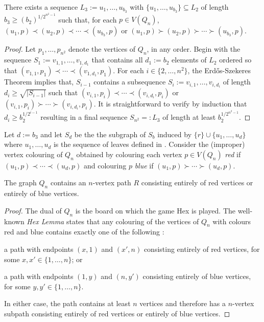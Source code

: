 \documentclass[kpfonts]{patmorin}
\renewcommand{\ge}{\geqslant}
\begin{document}
\begin{lem}
    There exists a sequence $L_3:=u_1,\ldots,u_{b_3}$ with $\{u_1,\ldots,u_{b_3}\}\subseteq L_2$ of length $b_3\ge (b_2)^{1/2^{n^2-1}}$ such that, for each $p\in V(Q_n)$, $(u_1,p)\prec (u_2,p)\prec\cdots\prec (u_{b_3},p)$ or $(u_1,p)\succ (u_2,p)\succ\cdots\succ (u_{b_3},p)$.
\end{lem}

\begin{proof}
    Let $p_1,\ldots,p_{n^2}$ denote the vertices of $Q_n$, in any order.
    Begin with the sequence $S_1:=v_{1,1},\ldots,v_{1,d_1}$ that contains all $d_1:=b_2$ elements of $L_2$ ordered so that $(v_{1,1},p_1)\prec\cdots\prec(v_{1,d_1},p_1)$.  For each $i\in\{2,\ldots,n^2\}$, the Erd\H{o}s-Szekeres Theorem implies that, $S_{i-1}$ contains a subsequence $S_i:=v_{i,1},\ldots,v_{i,d_i}$ of length $d_i\ge \sqrt{|S_{i-1}|}$ such that $(v_{i,1},p_i)\prec\cdots\prec(v_{i,d_i},p_i)$ or $(v_{i,1},p_i)\succ\cdots\succ(v_{i,d_i},p_i)$.  It is straightforward to verify by induction that $d_i \ge b_2^{1/2^{i-1}}$ resulting in a final sequence $S_{n^2}=:L_3$ of length at least $b_2^{1/2^{n^2-1}}$.
\end{proof}

Let $d:=b_3$ and let $S_d$ be the the subgraph of $S_b$ induced by $\{r\}\cup\{u_1,\ldots,u_{d}\}$ where $u_1,\ldots,u_d$ is the sequence of leaves defined in .  Consider the (improper) vertex colouring of $Q_n$ obtained by colouring each vertex $p\in V(Q_n)$ \emph{red} if $(u_1,p)\prec\cdots\prec (u_d,p)$ and colouring $p$ \emph{blue} if $(u_1,p)\succ\cdots\succ(u_d,p)$.

\begin{lem}
    The graph $Q_n$ contains an $n$-vertex path $R$ consisting entirely of red vertices or entirely of blue vertices.
\end{lem}

\begin{proof}
    The dual of $Q_n$ is the board on which the game Hex is played.  The well-known \emph{Hex Lemma} states that any colouring of the vertices of $Q_n$ with colours red and blue contains exactly one of the following \cite{Gale79}:
    \begin{compactenum}
        \item a path with endpoints $(x,1)$ and $(x',n)$ consisting entirely of red vertices, for some $x,x'\in\{1,\ldots,n\}$; or
        \item a path with endpoints $(1,y)$ and $(n,y')$ consisting entirely of blue vertices, for some $y,y'\in\{1,\ldots,n\}$.
    \end{compactenum}
    In either case, the path contains at least $n$ vertices and therefore has a $n$-vertex subpath consisting entirely of red vertices or entirely of blue vertices.
\end{proof}
\end{document}

